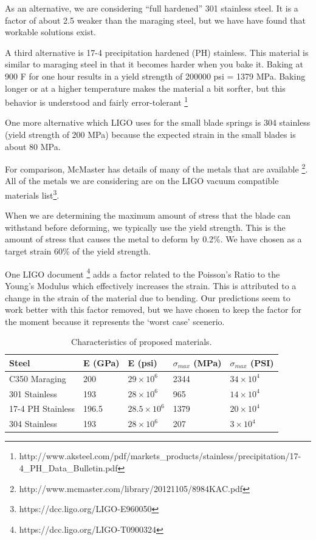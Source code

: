 As an alternative, we are considering ``full hardened'' 301 stainless steel.  It is a factor of about 2.5 weaker than the maraging steel, but we have have found that workable solutions exist.

A third alternative is 17-4 precipitation hardened (PH) stainless.  This material is similar to maraging steel in that it becomes harder when you bake it.  Baking at 900 F for one hour results in a yield strength of 200000 psi = 1379 MPa.  Baking longer or at a higher temperature makes the material a bit sorfter, but this behavior is understood and fairly error-tolerant \footnote{http://www.aksteel.com/pdf/markets\_products/stainless/precipitation/17-4\_PH\_Data\_Bulletin.pdf}

One more alternative which LIGO uses for the small blade springs is 304 stainless (yield strength of 200 MPa) because the expected strain in the small blades is about 80 MPa.

For comparison, McMaster has details of many of the metals that are available \footnote{http://www.mcmaster.com/library/20121105/8984KAC.pdf}. All of the metals we are considering are on the LIGO vacuum compatible materials list\footnote{https://dcc.ligo.org/LIGO-E960050}.

When we are determining the maximum amount of stress that the blade can withstand before deforming, we typically use the yield strength.  This is the amount of stress that causes the metal to deform by 0.2\%.  We have chosen as a target strain 60\% of the yield strength.

One LIGO document \footnote{https://dcc.ligo.org/LIGO-T0900324} adds a factor related to the Poisson's Ratio to the Young's Modulus which effectively increases the strain.  This is attributed to a change in the strain of the material due to bending.  Our predictions seem to work better with this factor removed, but we have chosen to keep the factor for the moment because it represents the `worst case' scenerio.  



\begin{table}[ht]
	\centering
		\begin{tabular}{ l | l | l | l | l }
			Steel & E (GPa) & E (psi) & $\sigma_{max}$ (MPa)  & $\sigma_{max}$ (PSI) \\ \hline
			C350 Maraging & 200 & $29\times10^6$ & 2344 & $34\times10^4$ \\ \hline
			301 Stainless & 193 & $28\times10^6$ & 965 & $14\times10^4$ \\ \hline
			17-4 PH Stainless & 196.5 & $28.5\times10^6$ & 1379 & $20\times10^4$\\ \hline
			304 Stainless &  193 & $28\times10^6$ & 207 & $3\times10^4$
		\end{tabular}
	\caption{Characteristics of proposed materials.}
	\label{tab:materials}
\end{table}

